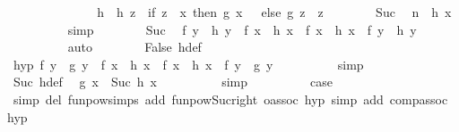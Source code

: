 \begin{isabellebody}
\ \ \ \ \ \ \isamarkupfalse%
\isanewline
\ \ \ \ \ \ \isamarkupfalse%
\ h\ \ {\isachardoublequoteopen}h\ z\ {\isacharequal}{\kern0pt}\ {\isacharparenleft}{\kern0pt}if\ z\ {\isacharequal}{\kern0pt}\ x\ then\ g\ x\ {\isacharminus}{\kern0pt}\ {}\ else\ g\ z{\isacharparenright}{\kern0pt}{\isachardoublequoteclose}\ \ z\isanewline
\ \ \ \ \ \ \isamarkupfalse%
\ Suc\ \isamarkupfalse%
\ {\isachardoublequoteopen}n\ {\isacharequal}{\kern0pt}\ h\ x{\isachardoublequoteclose}\isanewline
\ \ \ \ \ \ \ \ \isamarkupfalse%
\ simp\isanewline
\ \ \ \ \ \ \isamarkupfalse%
\ Suc\ \isamarkupfalse%
\ {\isachardoublequoteopen}f\ y\ {\isacharcircum}{\kern0pt}{\isacharcircum}{\kern0pt}\ h\ y\ {\isasymcirc}\ f\ x\ {\isacharcircum}{\kern0pt}{\isacharcircum}{\kern0pt}\ h\ x\ {\isacharequal}{\kern0pt}\ f\ x\ {\isacharcircum}{\kern0pt}{\isacharcircum}{\kern0pt}\ h\ x\ {\isasymcirc}\ f\ y\ {\isacharcircum}{\kern0pt}{\isacharcircum}{\kern0pt}\ h\ y{\isachardoublequoteclose}\isanewline
\ \ \ \ \ \ \ \ \isamarkupfalse%
\ auto\isanewline
\ \ \ \ \ \ \isamarkupfalse%
\ False\ h{\isacharunderscore}{\kern0pt}def\ \isamarkupfalse%
\ hyp{}{\isacharcolon}{\kern0pt}\ {\isachardoublequoteopen}f\ y\ {\isacharcircum}{\kern0pt}{\isacharcircum}{\kern0pt}\ g\ y\ {\isasymcirc}\ f\ x\ {\isacharcircum}{\kern0pt}{\isacharcircum}{\kern0pt}\ h\ x\ {\isacharequal}{\kern0pt}\ f\ x\ {\isacharcircum}{\kern0pt}{\isacharcircum}{\kern0pt}\ h\ x\ {\isasymcirc}\ f\ y\ {\isacharcircum}{\kern0pt}{\isacharcircum}{\kern0pt}\ g\ y{\isachardoublequoteclose}\isanewline
\ \ \ \ \ \ \ \ \isamarkupfalse%
\ simp\isanewline
\ \ \ \ \ \ \isamarkupfalse%
\ Suc\ h{\isacharunderscore}{\kern0pt}def\ \isamarkupfalse%
\ {\isachardoublequoteopen}g\ x\ {\isacharequal}{\kern0pt}\ Suc\ {\isacharparenleft}{\kern0pt}h\ x{\isacharparenright}{\kern0pt}{\isachardoublequoteclose}\isanewline
\ \ \ \ \ \ \ \ \isamarkupfalse%
\ simp\isanewline
\ \ \ \ \ \ \isamarkupfalse%
\ \isamarkupfalse%
\ {\isacharquery}{\kern0pt}case\isanewline
\ \ \ \ \ \ \ \ \isamarkupfalse%
\ {\isacharparenleft}{\kern0pt}simp\ del{\isacharcolon}{\kern0pt}\ funpow{\isachardot}{\kern0pt}simps\ add{\isacharcolon}{\kern0pt}\ funpow{\isacharunderscore}{\kern0pt}Suc{\isacharunderscore}{\kern0pt}right\ o{\isacharunderscore}{\kern0pt}assoc\ hyp{}{\isacharparenright}{\kern0pt}\ {\isacharparenleft}{\kern0pt}simp\ add{\isacharcolon}{\kern0pt}\ comp{\isacharunderscore}{\kern0pt}assoc\ hyp{}{\isacharparenright}{\kern0pt}\isanewline

\end{isabellebody}
